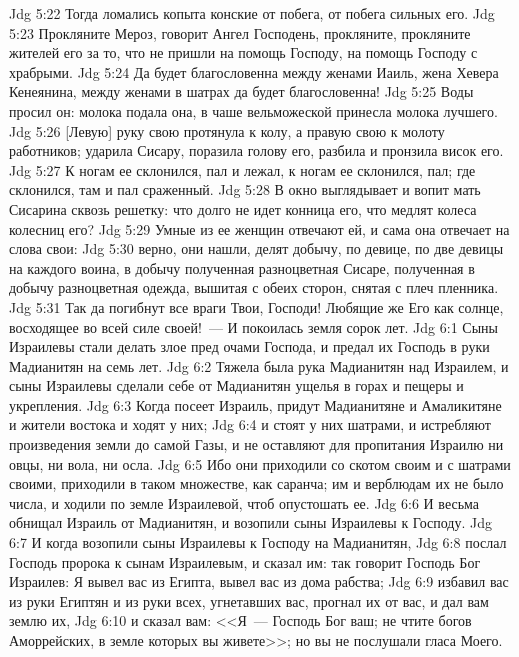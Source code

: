 \vs Jdg 5:22 Тогда ломались копыта конские от побега, от побега сильных его.
\vs Jdg 5:23 Прокляните Мероз, говорит Ангел Господень, прокляните, прокляните жителей его за то, что не пришли на помощь Господу, на помощь Господу с храбрыми.
\vs Jdg 5:24 Да будет благословенна между женами Иаиль, жена Хевера Кенеянина, между женами в шатрах да будет благословенна!
\vs Jdg 5:25 Воды просил он: молока подала она, в чаше вельможеской принесла молока лучшего.
\vs Jdg 5:26 [Левую] руку свою протянула к колу, а правую свою к молоту работников; ударила Сисару, поразила голову его, разбила и пронзила висок его.
\vs Jdg 5:27 К ногам ее склонился, пал и лежал, к ногам ее склонился, пал; где склонился, там и пал сраженный.
\vs Jdg 5:28 В окно выглядывает и вопит мать Сисарина сквозь решетку: что долго не идет конница его, что медлят колеса колесниц его?
\vs Jdg 5:29 Умные из ее женщин отвечают ей, и сама она отвечает на слова свои:
\vs Jdg 5:30 верно, они нашли, делят добычу, по девице, по две девицы на каждого воина, в добычу полученная разноцветная  Сисаре, полученная в добычу разноцветная одежда, вышитая с обеих сторон, снятая с плеч пленника.
\vs Jdg 5:31 Так да погибнут все враги Твои, Господи! Любящие же Его  как солнце, восходящее во всей силе своей!~--- И покоилась земля сорок лет.
\vs Jdg 6:1 Сыны Израилевы стали  делать злое пред очами Господа, и предал их Господь в руки Мадианитян на семь лет.
\vs Jdg 6:2 Тяжела была рука Мадианитян над Израилем, и сыны Израилевы сделали себе от Мадианитян ущелья в горах и пещеры и укрепления.
\vs Jdg 6:3 Когда посеет Израиль, придут Мадианитяне и Амаликитяне и жители востока и ходят у них;
\vs Jdg 6:4 и стоят у них шатрами, и истребляют произведения земли до самой Газы, и не оставляют для пропитания Израилю ни овцы, ни вола, ни осла.
\vs Jdg 6:5 Ибо они приходили со скотом своим и с шатрами своими, приходили в таком множестве, как саранча; им и верблюдам их не было числа, и ходили по земле Израилевой, чтоб опустошать ее.
\vs Jdg 6:6 И весьма обнищал Израиль от Мадианитян, и возопили сыны Израилевы к Господу.
\rsbpar\vs Jdg 6:7 И когда возопили сыны Израилевы к Господу на Мадианитян,
\vs Jdg 6:8 послал Господь пророка к сынам Израилевым, и сказал им: так говорит Господь Бог Израилев: Я вывел вас из Египта, вывел вас из дома рабства;
\vs Jdg 6:9 избавил вас из руки Египтян и из руки всех, угнетавших вас, прогнал их от вас, и дал вам землю их,
\vs Jdg 6:10 и сказал вам: <<Я~--- Господь Бог ваш; не чтите богов Аморрейских, в земле которых вы живете>>; но вы не послушали гласа Моего.
